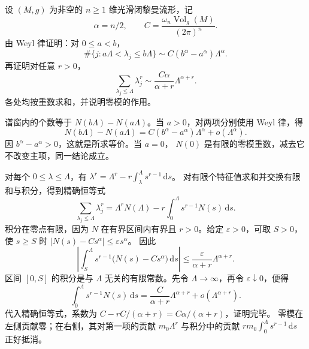 \begin{exercise}\label{g3:ex:weyl-windows-moments}
	设 \((M,g)\) 为非空的 \(n\ge1\) 维光滑闭黎曼流形，记
	\[
		\alpha=n/2,\qquad
		C=\frac{\omega_n\operatorname{Vol}_g(M)}{(2\pi)^n}.
	\]
	由 Weyl 律证明：对 \(0\le a<b\)，
	\[
		\#\{j:a\Lambda<\lambda_j\le b\Lambda\}
		\sim C(b^\alpha-a^\alpha)\Lambda^\alpha.
	\]
	再证明对任意 \(r>0\)，
	\[
		\sum_{\lambda_j\le\Lambda}\lambda_j^r
		\sim\frac{C\alpha}{\alpha+r}\Lambda^{\alpha+r}.
	\]
	各处均按重数求和，并说明零模的作用。
\end{exercise}
\begin{solution}
	谱窗内的个数等于 \(N(b\Lambda)-N(a\Lambda)\)。当 \(a>0\)，对两项分别使用 Weyl 律，得
	\[
		N(b\Lambda)-N(a\Lambda)
		=C(b^\alpha-a^\alpha)\Lambda^\alpha+o(\Lambda^\alpha).
	\]
	因 \(b^\alpha-a^\alpha>0\)，这就是所求等价。当 \(a=0\)，
	\(N(0)\) 是有限的零模重数，减去它不改变主项，同一结论成立。

	对每个 \(0\le\lambda\le\Lambda\)，有
	\(\lambda^r=\Lambda^r-r\int_\lambda^\Lambda s^{r-1}\,\mathrm ds\)。
	对有限个特征值求和并交换有限和与积分，得到精确恒等式
	\[
		\sum_{\lambda_j\le\Lambda}\lambda_j^r
		=\Lambda^rN(\Lambda)
		-r\int_0^\Lambda s^{r-1}N(s)\,\mathrm ds.
	\]
	积分在零点有限，因为 \(N\) 在有界区间内有界且 \(r>0\)。给定 \(\varepsilon>0\)，可取 \(S>0\)，使 \(s\ge S\) 时
	\(|N(s)-Cs^\alpha|\le\varepsilon s^\alpha\)。
	因此
	\[
		\left|\int_S^\Lambda s^{r-1}
		\bigl(N(s)-Cs^\alpha\bigr)\,\mathrm ds\right|
		\le\frac{\varepsilon}{\alpha+r}\Lambda^{\alpha+r}.
	\]
	区间 \([0,S]\) 的积分是与 \(\Lambda\) 无关的有限常数。先令 \(\Lambda\to\infty\)，再令 \(\varepsilon\downarrow0\)，便得
	\[
		\int_0^\Lambda s^{r-1}N(s)\,\mathrm ds
		=\frac C{\alpha+r}\Lambda^{\alpha+r}
		+o(\Lambda^{\alpha+r}).
	\]
	代入精确恒等式，系数为
	\(C-rC/(\alpha+r)=C\alpha/(\alpha+r)\)，证明完毕。
	零模在左侧贡献零；在右侧，其对第一项的贡献
	\(m_0\Lambda^r\) 与积分中的贡献
	\(r m_0\int_0^\Lambda s^{r-1}\,\mathrm ds\) 正好抵消。
\end{solution}

